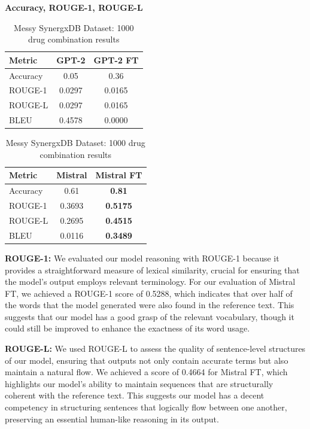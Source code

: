 \documentclass[11pt]{article}
\begin{document}
\begin{table}[ht]
\centering
\caption{Messy SynergxDB Dataset: 1000 drug combination results}
\label{table:result}
\textbf{Accuracy, ROUGE-1, ROUGE-L}
\par\medskip %
\begin{tabular}{|l|c|c|}
\hline
\textbf{Metric} & \textbf{GPT-2} & \textbf{GPT-2 FT} \\
\hline
Accuracy & 0.05 & 0.36 \\
ROUGE-1 & 0.0297 & 0.0165 \\
ROUGE-L & 0.0297 & 0.0165 \\
BLEU & 0.4578 & 0.0000 \\
\hline
\end{tabular}
\par\medskip %
\begin{tabular}{|l|c|c|}
\hline
\textbf{Metric} & \textbf{Mistral} & \textbf{Mistral FT} \\
\hline
Accuracy & 0.61 & \textbf{0.81} \\
ROUGE-1 & 0.3693 & \textbf{0.5175} \\
ROUGE-L & 0.2695 & \textbf{0.4515} \\
BLEU & 0.0116 & \textbf{0.3489} \\
\hline
\end{tabular}
\end{table}

\textbf{ROUGE-1:} We evaluated our model reasoning with ROUGE-1 because it provides a straightforward measure of lexical similarity, crucial for ensuring that the model's output employs relevant terminology. For our evaluation of Mistral FT, we achieved a ROUGE-1 score of 0.5288, which indicates that over half of the words that the model generated were also found in the reference text. This suggests that our model has a good grasp of the relevant vocabulary, though it could still be improved to enhance the exactness of its word usage.

\textbf{ROUGE-L:} We used ROUGE-L to assess the quality of sentence-level structures of our model, ensuring that outputs not only contain accurate terms but also maintain a natural flow. We achieved a score of 0.4664 for Mistral FT, which highlights our model's ability to maintain sequences that are structurally coherent with the reference text. This suggests our model has a decent competency in structuring sentences that logically flow between one another, preserving an essential human-like reasoning in its output.
\end{document}
